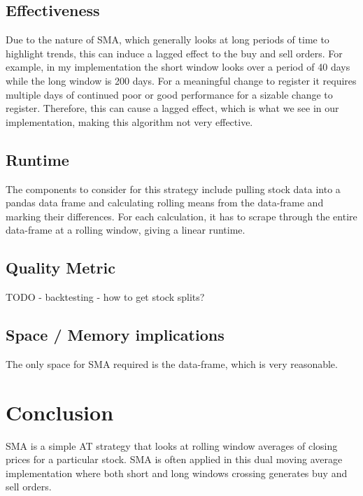 \documentclass[letterpaper,11pt]{article}
\begin{document}
\subsection*{Effectiveness}
Due to the nature of SMA, which generally looks at long periods of time to highlight trends, this can induce a lagged effect to the buy and sell orders. For example, in my implementation the short window looks over a period of 40 days while the long window is 200 days. For a meaningful change to register it requires multiple days of continued poor or good performance for a sizable change to register. Therefore, this can cause a lagged effect, which is what we see in our implementation, making this algorithm not very effective.

\subsection*{Runtime}
The components to consider for this strategy include pulling stock data into a pandas data frame and calculating rolling means from the data-frame and marking their differences. For each calculation, it has to scrape through the entire data-frame at a rolling window, giving a linear runtime.

\subsection*{Quality Metric}
TODO - backtesting - how to get stock splits?

\subsection*{Space / Memory implications}
The only space for SMA required is the data-frame, which is very reasonable.

\section*{Conclusion}

SMA is a simple AT strategy that looks at rolling window averages of closing prices for a particular stock. SMA is often applied in this dual moving average implementation where both short and long windows crossing generates buy and sell orders.
\end{document}

